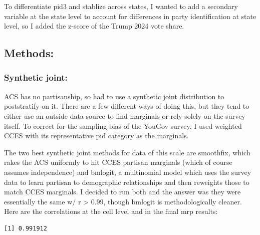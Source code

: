 \documentclass[
  letterpaper,
  DIV=11,
  numbers=noendperiod]{scrartcl}
\newenvironment{Shaded}{\begin{snugshade}}{\end{snugshade}}
\newcommand{\CommentTok}[1]{\textcolor[rgb]{0.37,0.37,0.37}{#1}}
\newcommand{\FunctionTok}[1]{\textcolor[rgb]{0.28,0.35,0.67}{#1}}
\newcommand{\NormalTok}[1]{\textcolor[rgb]{0.00,0.23,0.31}{#1}}
\newcommand{\SpecialCharTok}[1]{\textcolor[rgb]{0.37,0.37,0.37}{#1}}
\begin{document}
To differentiate pid3 and stablize across states, I wanted to add a
secondary variable at the state level to account for differences in
party identification at state level, so I added the z-score of the Trump
2024 vote share.

\subsection{Methods:}\label{methods}

\subsubsection{Synthetic joint:}\label{synthetic-joint}

ACS has no partisanship, so had to use a synthetic joint distribution to
poststratify on it. There are a few different ways of doing this, but
they tend to either use an outside data source to find marginals or rely
solely on the survey itself. To correct for the sampling bias of the
YouGov survey, I used weighted CCES with its representative pid category
as the marginals.

The two best synthetic joint methods for data of this scale are
smoothfix, which rakes the ACS uniformly to hit CCES partisan marginals
(which of course assumes independence) and bmlogit, a multinomial model
which uses the survey data to learn partisan to demographic
relationships and then reweights those to match CCES marginals. I
decided to run both and the answer was they were essentially the same w/
r \textgreater{} 0.99, though bmlogit is methodologically cleaner. Here
are the correlations at the cell level and in the final mrp results:

\begin{Shaded}
\end{Shaded}

\begin{verbatim}
[1] 0.991912
\end{verbatim}

\begin{Shaded}
\end{Shaded}
\end{document}
